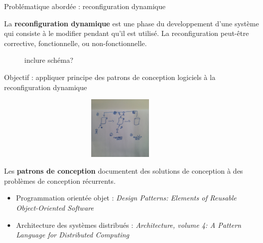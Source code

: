 

\begin{frame}{Problématique abordée : reconfiguration dynamique}
\begin{definition}
La \textbf{reconfiguration dynamique} est une phase du
developpement d'une système qui consiste à le modifier pendant qu’il est
utilisé. La reconfiguration peut-être corrective, fonctionnelle,  ou
non-fonctionnelle.
\end{definition}
\begin{figure}
inclure schéma? 
\end{figure}
\end{frame}

\begin{frame}{Objectif : appliquer principe des patrons de conception logiciels à la reconfiguration dynamique}
\begin{figure}
\includegraphics[width=10cm, height=3cm]{imgs/slide_application_patron}
\end{figure}
\begin{definition}
Les \textbf{patrons de conception} documentent des solutions de
conception à des problèmes de conception récurrents.
\end{definition}
\begin{exampleblock}{}
\begin{itemize}
\item Programmation orientée objet : \textit{Design Patterns: Elements of
Reusable Object-Oriented Software} 
\item Architecture des systèmes distribués : \textit{Architecture,
volume 4: A Pattern Language for Distributed Computing}
\end{itemize}
\end{exampleblock}
\end{frame}


